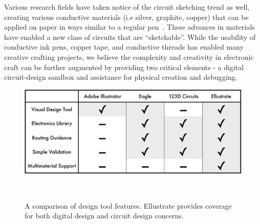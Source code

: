 \documentclass{sigchi}
\begin{document}
Various research fields have taken notice of the circuit sketching trend as well, creating various conductive materials (i.e silver, graphite, copper) that can be applied on paper in ways similar to a regular pen~\cite{russo2011pen,Anonymous:ojhPyGTN}. These advances in materials have enabled a new class of circuits that are ``sketchable''. While the usability of conductive ink pens, copper tape, and conductive threads has enabled many creative crafting projects, we believe the complexity and creativity in electronic craft can be further augmented by providing two critical elements - a digital circuit-design sandbox and assistance for physical creation and debugging. 

\begin{figure}[b]
\centering
  \includegraphics[width=1\columnwidth]{figures/comparative_table.pdf}
  \caption{A comparison of design tool features. Ellustrate provides coverage for both digital design and circuit design concerns. }~\label{fig:comparison_table}
  \vspace{-16pt}
\end{figure}
\end{document}

